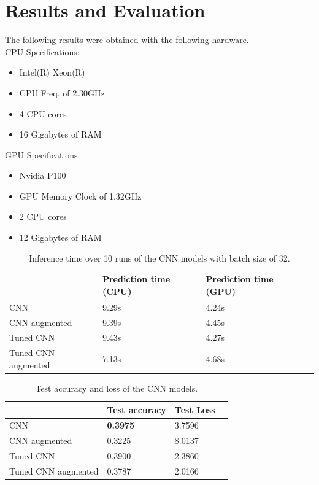 \section{Results and Evaluation}

The following results were obtained with the following hardware.\\
CPU Specifications:
\begin{itemize}
\item Intel(R) Xeon(R)
\item CPU Freq. of 2.30GHz
\item 4 CPU cores
\item 16 Gigabytes of RAM
\end{itemize}
GPU Specifications:
\begin{itemize}
\item Nvidia P100
\item GPU Memory Clock of 1.32GHz
\item 2 CPU cores
\item 12 Gigabytes of RAM
\end{itemize}


\begin{table}[ht]
\begin{tabular}{|l|l|l|l|}
\hline
                    & Prediction time (CPU) & Prediction time (GPU) \\ \hline
CNN                 & 9.29s                 & 4.24s                 \\ \hline
CNN augmented       & 9.39s                 & 4.45s                 \\ \hline
Tuned CNN           & 9.43s                 & 4.27s                 \\ \hline
Tuned CNN augmented & 7.13s                 & 4.68s                 \\ \hline
\end{tabular}
\caption{Inference time over 10 runs of the CNN models with batch size of 32.}
\label{table:pred_time}
\end{table}


\begin{table}[ht]
\begin{tabular}{|l|l|l|l|}
\hline
                    & Test accuracy   & Test Loss \\ \hline
CNN                 & \textbf{0.3975} & 3.7596    \\ \hline
CNN augmented       & 0.3225          & 8.0137    \\ \hline
Tuned CNN           & 0.3900          & 2.3860    \\ \hline
Tuned CNN augmented & 0.3787          & 2.0166    \\ \hline
\end{tabular}
\caption{Test accuracy and loss of the CNN models.}
\label{table:test_CNN}
\end{table}


